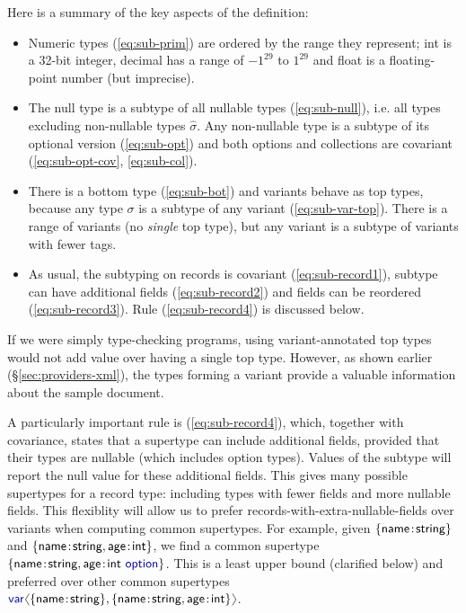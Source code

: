 \documentclass[10pt,preprint,blind,clearpagebib]{sigplanconf}
\newcommand{\langl}{\begin{picture}(4.5,7)
\put(1.1,2.5){\rotatebox{60}{\line(1,0){5.5}}}
\put(1.1,2.5){\rotatebox{300}{\line(1,0){5.5}}}
\end{picture}}
\newcommand{\rangl}{\begin{picture}(4.5,7)
\put(.9,2.5){\rotatebox{120}{\line(1,0){5.5}}}
\put(.9,2.5){\rotatebox{240}{\line(1,0){5.5}}}
\end{picture}}
\newcommand{\kvd}[1]{\textnormal{\textcolor{kvdclr}{\sffamily #1}}}
\newcommand{\ident}[1]{\textnormal{\sffamily #1}}
\begin{document}

\noindent
Here is a summary of the key aspects of the definition:
\begin{itemize}
\item Numeric types (\ref{eq:sub-prim}) are ordered by the range they represent;
  \ident{int} is a 32-bit integer, \ident{decimal} has a range of $-1^{29}$ to $1^{29}$ and 
  \ident{float} is a floating-point number (but imprecise).

\item The \kvd{null} type is a subtype of all nullable types (\ref{eq:sub-null}), i.e. all 
  types excluding non-nullable types $\hat{\sigma}$. Any non-nullable type is a 
  subtype of its optional version (\ref{eq:sub-opt}) and both options and collections are 
  covariant (\ref{eq:sub-opt-cov}, \ref{eq:sub-col}).

\item There is a bottom type (\ref{eq:sub-bot}) and variants behave as top types, because
  any type $\sigma$ is a subtype of any variant (\ref{eq:sub-var-top}). There is a range of
  variants (no \emph{single} top type), but any variant is a subtype of variants with fewer tags.

\item As usual, the subtyping on records is covariant (\ref{eq:sub-record1}), subtype can have 
  additional fields (\ref{eq:sub-record2}) and fields can  be reordered (\ref{eq:sub-record3}). 
  Rule (\ref{eq:sub-record4}) is discussed below.
\end{itemize}

\noindent
If we were simply type-checking programs, using variant-annotated top types  
would not add value over having a single top type. However, as shown earlier (\S\ref{sec:providers-xml}), 
the types forming a variant provide a valuable information about the sample document.

A particularly important rule is (\ref{eq:sub-record4}), which, 
together with covariance, states that a supertype can include additional fields, 
provided that their types are nullable (which includes option types). Values of the subtype
will report the null value for these additional fields.
This gives many possible supertypes for a record type: including types with fewer fields and more nullable fields.
This flexiblity will allow us to prefer records-with-extra-nullable-fields
over variants when computing common supertypes. For example, given 
$\{ \ident{name}\!:\!\ident{string} \}$ and $\{ \ident{name}\!:\!\ident{string}, \ident{age}\!:\!\ident{int} \}$,
we find a common supertype $\{ \ident{name}\!:\!\ident{string}, \ident{age}\!:\!\ident{int}~\kvd{option} \}$.
This is a least upper bound (clarified below) and preferred over other common supertypes 
$\kvd{var}\langl \{ \ident{name}\!:\!\ident{string} \}, \{ \ident{name}\!:\!\ident{string}, \ident{age}\!:\!\ident{int} \}\rangl$.
\end{document}
